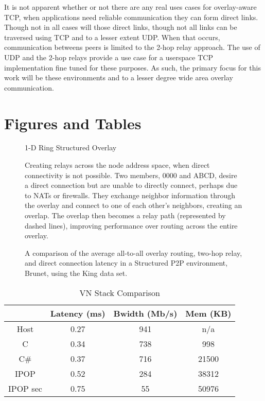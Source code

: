 It is not apparent whether or not there are any real uses cases for 
overlay-aware TCP, when applications need reliable communication they can form
direct links.  Though not in all cases will those direct links, though not
all links can be traversed using TCP and to a lesser extent UDP.  When that
occurs, communication betweens peers is limited to the 2-hop relay approach.
The use of UDP and the 2-hop relays provide a use case for a userspace TCP
implementation fine tuned for these purposes.  As such, the primary focus for
this work will be these environments and to a lesser degree wide area overlay
communication.

\section{Figures and Tables}

\begin{figure}[ht]
\centering
{}
\caption{1-D Ring Structured Overlay}
\label{fig:ring_overlay}
\end{figure}

\begin{figure}[ht]
\centering
{}
\caption[Proactive relay creation]{Creating relays across the node address
space, when direct connectivity is not possible.  Two members, 0000 and ABCD, 
desire a direct connection but are unable to directly connect, perhaps due to
NATs or firewalls.  They exchange neighbor information through the overlay and
connect to one of each other's neighbors, creating an overlap.  The overlap
then becomes a relay path (represented by dashed lines), improving performance
over routing across the entire overlay.}
\label{fig:relay}
\end{figure}

\begin{figure}[ht]
\centering
{}
\caption[Relay evaluation]{A comparison of the average all-to-all overlay
routing, two-hop relay, and direct connection latency in a Structured P2P
environment, Brunet, using the King data set.}
\label{fig:simulated_relays}
\end{figure}


\begin{table}[ht]
\caption{VN Stack Comparison}
\label{tab:vpn_eval_comp}
\begin{tabular}{c||c|c|c}
& Latency (ms) & Bwidth (Mb/s) & Mem (KB) \\\hline
Host & 0.27 & 941 & n/a \\\hline
C & 0.34 & 738 & 998 \\\hline
C\# & 0.37 & 716 & 21500 \\\hline
IPOP & 0.52 & 284 & 38312 \\\hline
IPOP sec & 0.75 & 55 & 50976 \\\hline
\end{tabular}
\centering
\end{table}
